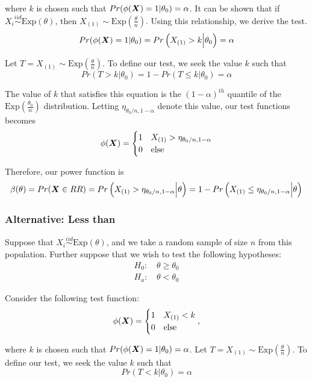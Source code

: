 \documentclass[]{article}
\newcommand{\bfX}{\mbox{\boldmath $X$}}
\begin{document}
where $k$ is chosen such that $Pr(\phi(\bfX) = 1|\theta_0) = \alpha$. It can be shown that if $X_i \stackrel{iid}{\sim} \text{Exp}(\theta)$, then $X_{(1)} \sim \text{Exp}(\frac{\theta}{n})$. Using this relationship, we derive the test. 
\[
\begin{split}
Pr(\phi(\bfX) = 1|\theta_0) = Pr\left(X_{(1)} > k\Big|\theta_0\right) = \alpha 
\end{split}
\]

Let $T = X_{(1)} \sim \text{Exp}(\frac{\theta}{n})$. To define our test, we seek the value $k$ such that 
\[
Pr(T > k | \theta_0) = 1 - Pr(T \leq k | \theta_0) = \alpha
\]

The value of $k$ that satisfies this equation is the $(1 - \alpha)^{th}$ quantile of the $\text{Exp}(\frac{\theta_0}{n})$ distribution. Letting $\eta_{\theta_0/n, 1-\alpha}$ denote this value, our test functions becomes
\[
\phi(\bfX) = \begin{cases}
1 & X_{(1)} > \eta_{\theta_0/n, 1-\alpha} \\
0 & \text{else}
\end{cases}
\]

Therefore, our power function is
\[
\beta(\theta) = Pr(\bfX \in RR) = Pr\left(X_{(1)} > \eta_{\theta_0/n, 1-\alpha} \Big| \theta\right) = 1 - Pr\left(X_{(1)}\leq \eta_{\theta_0/n, 1-\alpha} \Big| \theta\right)
\]

\subsubsection{Alternative: Less than}

Suppose that $X_i \stackrel{iid}{\sim} \text{Exp}(\theta)$, and we take a random sample of size $n$ from this population. Further suppose that we wish to test the following hypotheses:
\[
\begin{split}
\text{$H_0$: }& \theta \geq \theta_0 \\
\text{$H_a$: }& \theta < \theta_0
\end{split}
\]

Consider the following test function:
\[
\phi(\bfX) = \begin{cases}
1 & X_{(1)} < k \\
0 & \text{else}
\end{cases},
\]

where $k$ is chosen such that $Pr(\phi(\bfX) = 1|\theta_0) = \alpha$. Let $T = X_{(1)} \sim \text{Exp}(\frac{\theta}{n})$. To define our test, we seek the value $k$ such that 
\[
Pr(T < k | \theta_0) = \alpha
\]
\end{document}
